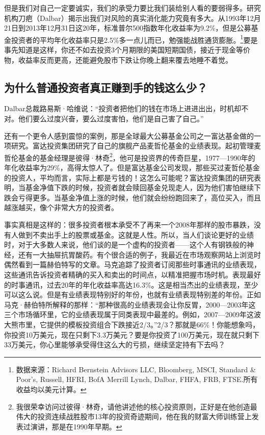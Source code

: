 但是我们对自己一定要诚实，我们的承受力要比我们装给别人看的要弱得多。研究机构刀疤（Dalbar）揭示出我们对风险的真实消化能力究竟有多大。从1993年12月21日到2013年12月31日这20年，标准普尔500指数年化收益率为9.2\%，但是公募基金投资者的平均年化收益率只是2.5\%多一点儿而已，勉强能战胜通货膨胀。\footnote{\label{fn:pdf-27-2}数据来源：Richard Bernstein Advisors LLC, Bloomberg, MSCI, Standard \& Poor’s, Russell, HFRI, BofA Merrill Lynch, Dalbar, FHFA, FRB, FTSE.所有收益均以美元计算。}要是事先知道是这样，你还不如去投资3个月期限的美国短期国债，接近于现金等价物，收益率反而更高，还能避免股市下跌让你晚上翻来覆去地睡不着觉。

\subsection{为什么普通投资者真正赚到手的钱这么少？}

Dalbar总裁路易斯·哈维说：“投资者把他们的钱在市场上进进出出，时机却不对。他们要么过度兴奋，要么过度害怕，他们是自己害了自己。”

还有一个更令人感到震惊的案例，那是全球最大公募基金公司之一富达基金做的一项研究。富达投资集团研究了自己的旗舰产品麦哲伦基金的业绩表现。起初管理麦哲伦基金的基金经理是彼得·林奇\footnote{\label{fn:pdf-27-3}我很荣幸访问过彼得·林奇，请他讲述他的核心投资原则，正好是在他创造最伟大的投资连续战胜股市13年的投资奇迹期间，他在我的财富大师训练营上发表过演讲，那是在1990年早期。}，他可是投资界的传奇巨星，1977—1990年的年化收益率为29\%，高得太惊人了。但是富达基金公司发现，那些买过麦哲伦基金的投资人，平均而言，实际上都是亏钱的！这怎么可能呢？富达投资集团的研究表明，当基金净值下跌的时候，投资者就会赎回基金兑现走人，因为他们害怕继续下跌会亏得更多。当基金净值上涨的时候，他们就会纷纷跑回来了，高位买入，而且越涨越买，像个非常大方的投资者。

事实真相是这样的：很多投资者根本承受不了再来一个2008年那样的股市暴跌，没有人做到不卖出手上的股票或基金。这就是人性。所以，当人们谈论更好的业绩时，对于大多数人来说，他们谈的是一个虚构的投资者——这个人有钢铁般的神经，还有一大抽屉抗胃酸药。有个很合适的例子，我最近在市场观察网站上浏览时偶然看到一篇赫伯特写的文章。马克追踪了投资者订阅那些时事通讯的业绩表现，这些通讯告诉投资者精确的买入和卖出的时间点，以精准把握市场时机。表现最好的时事通讯，过去20年的年化收益率高达16.3\%。这是相当杰出的业绩表现，至少可以这么说。但是有业绩表现特别好的年份，也就有业绩表现特别差的年份。正如马克·赫伯特所解释的那样：“那种很高的业绩表现会让你反胃，2000—2003年这三个市场循环里，它的业绩表现属于同类表现中最差的。例如，2007—2009年这波大熊市里，它提供的模板投资组合下跌接近2/3。”2/3？那就是66\%！你能想象吗，你投资10万美元，现在只剩下3.3万美元？要是你投资了100万美元，现在就只剩下33万美元，你心里能够承受得住这么大的亏损，继续坚定持有下去吗？

